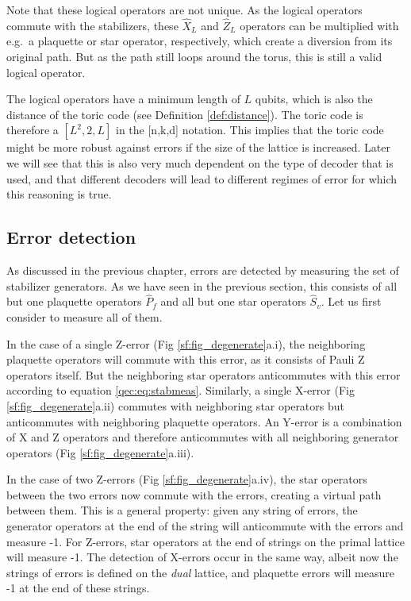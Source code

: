 Note that these logical operators are not unique. As the logical operators commute with the stabilizers, these $\hat{X}_L$ and $\hat{Z}_L$ operators can be multiplied with e.g.\ a plaquette or star operator, respectively, which create a diversion from its original path. But as the path still loops around the torus, this is still a valid logical operator.

The logical operators have a minimum length of $L$ qubits, which is also the distance of the toric code (see Definition \ref{def:distance}). The toric code is therefore a $[L^2,2,L]$ in the [n,k,d] notation. This implies that the toric code might be more robust against errors if the size of the lattice is increased. Later we will see that this is also very much dependent on the type of decoder that is used, and that different decoders will lead to different regimes of error for which this reasoning is true.


\subsection{Error detection}
As discussed in the previous chapter, errors are detected by measuring the set of stabilizer generators. As we have seen in the previous section, this consists of all but one plaquette operators $\hat{P}_f$ and all but one star operators $\hat{S}_v$. Let us first consider to measure all of them.

In the case of a single Z-error (Fig \ref{sf:fig_degenerate}a.i), the neighboring plaquette operators will commute with this error, as it consists of Pauli Z operators itself. But the neighboring star operators anticommutes with this error according to equation \eqref{qec:eq:stabmeas}. Similarly, a single X-error (Fig \ref{sf:fig_degenerate}a.ii) commutes with neighboring star operators but anticommutes with neighboring plaquette operators. An Y-error is a combination of X and Z operators and therefore anticommutes with all neighboring generator operators (Fig \ref{sf:fig_degenerate}a.iii).

In the case of two Z-errors (Fig \ref{sf:fig_degenerate}a.iv), the star operators between the two errors now commute with the errors, creating a virtual path between them. This is a general property: given any string of errors, the generator operators at the end of the string will anticommute with the errors and measure -1. For Z-errors, star operators at the end of strings on the primal lattice will measure -1. The detection of X-errors occur in the same way, albeit now the strings of errors is defined on the \emph{dual} lattice, and plaquette errors will measure -1 at the end of these strings.

